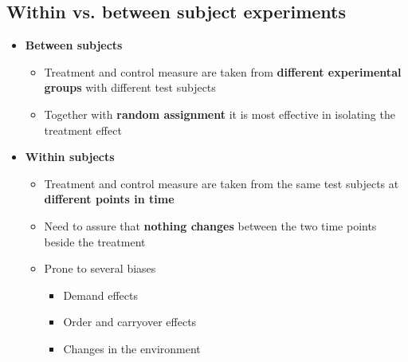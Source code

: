 \documentclass[10pt]{article}
\begin{document}
\subsection{Within vs. between subject experiments}
\begin{itemize}
    \item \textbf{Between subjects}
    \begin{itemize}
        \item Treatment and control measure are taken from \textbf{different experimental groups} with different test subjects 
        \item Together with \textbf{random assignment} it is most effective in isolating the treatment effect
    \end{itemize}
    \item \textbf{Within subjects}
    \begin{itemize}
        \item Treatment and control measure are taken from the same test subjects at \textbf{different points in time}
        \item Need to assure that \textbf{nothing changes} between the two time points beside the treatment 
        \item Prone to several biases 
        \begin{itemize}
            \item Demand effects 
            \item Order and carryover effects 
            \item Changes in the environment 
        \end{itemize}
    \end{itemize}
\end{itemize}
\newpage 
\end{document}
